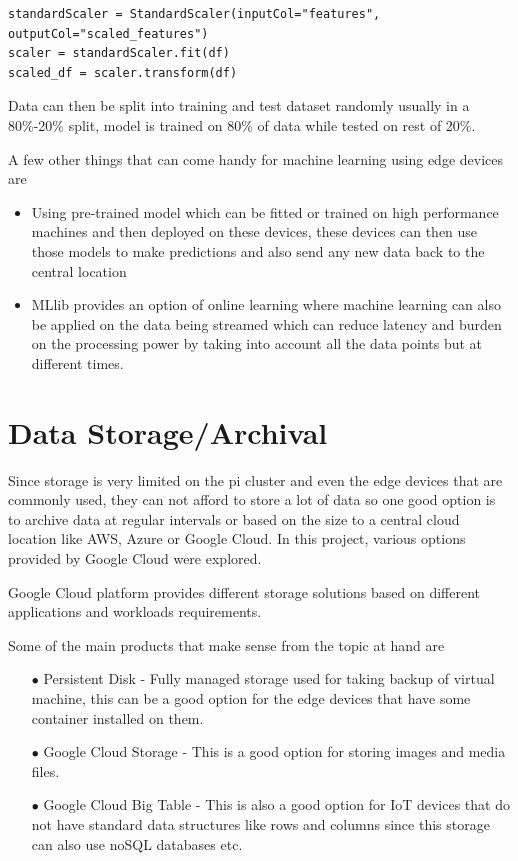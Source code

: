 \begin{verbatim}
standardScaler = StandardScaler(inputCol="features", outputCol="scaled_features")
scaler = standardScaler.fit(df)
scaled_df = scaler.transform(df)
\end{verbatim}
Data can then be split into training and test dataset randomly usually in a 80\%-20\% split, model is trained on 80\% of data while tested on rest of 20\%. 

A few other things that can come handy for machine learning using edge devices are
\begin{itemize}
\item Using pre-trained model which can be fitted or trained on high performance machines and then deployed on these devices, these devices can then use those models to make predictions and also send any new data back to the central location
\item MLlib provides an option of online learning where machine learning can also be applied on the data being streamed which can reduce latency and burden on the processing power by taking into account all the data points but at different times.
\end{itemize}

\section{Data Storage/Archival}
Since storage is very limited on the pi cluster and even the edge devices that are commonly used, they can not afford to store a lot of data so one good option is to archive data at regular intervals or based on the size to a central cloud location like AWS, Azure or Google Cloud. In this project, various options provided by Google Cloud were explored.

Google Cloud platform provides different storage solutions based on different applications and workloads requirements. 

Some of the main products that make sense from the topic at hand are

\begin{itemize}
\item[$\bullet$] Persistent Disk - Fully managed storage used for taking backup of virtual machine, this can be a good option for the edge devices that have some container installed on them.
\item[$\bullet$] Google Cloud Storage - This is a good option for storing images and media files.
\item[$\bullet$] Google Cloud Big Table - This is also a good option for IoT devices that do not have standard data structures like rows and columns since this storage can also use noSQL databases etc.
\end{itemize} 

